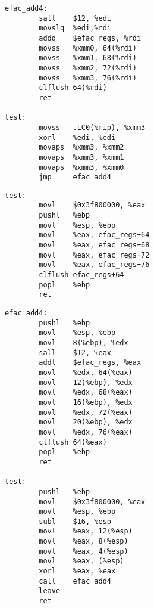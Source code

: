 \begin{lstlisting}[float=ht,caption={x86\_64 not inlined (gcc -S -m64 -O3 -fno-inline)},label={lst:noinline64}]
efac_add4:
        sall    $12, %edi
        movslq  %edi,%rdi
        addq    $efac_regs, %rdi
        movss   %xmm0, 64(%rdi)
        movss   %xmm1, 68(%rdi)
        movss   %xmm2, 72(%rdi)
        movss   %xmm3, 76(%rdi)
        clflush 64(%rdi)
        ret

test:
        movss   .LC0(%rip), %xmm3
        xorl    %edi, %edi
        movaps  %xmm3, %xmm2
        movaps  %xmm3, %xmm1
        movaps  %xmm3, %xmm0
        jmp     efac_add4
\end{lstlisting}

\begin{lstlisting}[float=ht,caption={x86 inlined (gcc -S -m32 -O3)},label={lst:inline32}]
test:
        movl    $0x3f800000, %eax
        pushl   %ebp
        movl    %esp, %ebp
        movl    %eax, efac_regs+64
        movl    %eax, efac_regs+68
        movl    %eax, efac_regs+72
        movl    %eax, efac_regs+76
        clflush efac_regs+64
        popl    %ebp
        ret
\end{lstlisting}

\begin{lstlisting}[float=ht,caption={x86 not inlined (gcc -S -m32 -O3 -fno-inline)},label={lst:noinline32}]
efac_add4:
        pushl   %ebp
        movl    %esp, %ebp
        movl    8(%ebp), %edx
        sall    $12, %eax
        addl    $efac_regs, %eax
        movl    %edx, 64(%eax)
        movl    12(%ebp), %edx
        movl    %edx, 68(%eax)
        movl    16(%ebp), %edx
        movl    %edx, 72(%eax)
        movl    20(%ebp), %edx
        movl    %edx, 76(%eax)
        clflush 64(%eax)
        popl    %ebp
        ret

test:
        pushl   %ebp
        movl    $0x3f800000, %eax
        movl    %esp, %ebp
        subl    $16, %esp
        movl    %eax, 12(%esp)
        movl    %eax, 8(%esp)
        movl    %eax, 4(%esp)
        movl    %eax, (%esp)
        xorl    %eax, %eax
        call    efac_add4
        leave
        ret
\end{lstlisting}
